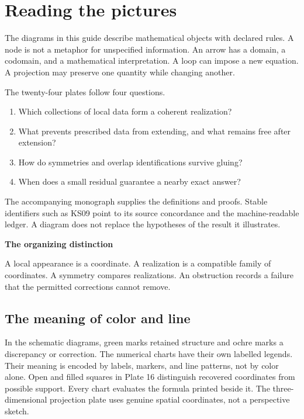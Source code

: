 \documentclass[11pt]{article}
\begin{document}
\KomorebiCover
\section*{Reading the pictures}
The diagrams in this guide describe mathematical objects with declared rules. A node is not a metaphor for unspecified information. An arrow has a domain, a codomain, and a mathematical interpretation. A loop can impose a new equation. A projection may preserve one quantity while changing another.

The twenty-four plates follow four questions.
\begin{enumerate}
\item Which collections of local data form a coherent realization?
\item What prevents prescribed data from extending, and what remains free after extension?
\item How do symmetries and overlap identifications survive gluing?
\item When does a small residual guarantee a nearby exact answer?
\end{enumerate}

The accompanying monograph supplies the definitions and proofs. Stable identifiers such as KS09 point to its source concordance and the machine-readable ledger. A diagram does not replace the hypotheses of the result it illustrates.

\begin{insight}
\textbf{The organizing distinction}\par
A local appearance is a coordinate. A realization is a compatible family of coordinates. A symmetry compares realizations. An obstruction records a failure that the permitted corrections cannot remove.
\end{insight}

\subsection*{The meaning of color and line}
In the schematic diagrams, green marks retained structure and ochre marks a discrepancy or correction. The numerical charts have their own labelled legends. Their meaning is encoded by labels, markers, and line patterns, not by color alone. Open and filled squares in Plate 16 distinguish recovered coordinates from possible support. Every chart evaluates the formula printed beside it. The three-dimensional projection plate uses genuine spatial coordinates, not a perspective sketch.
\end{document}
